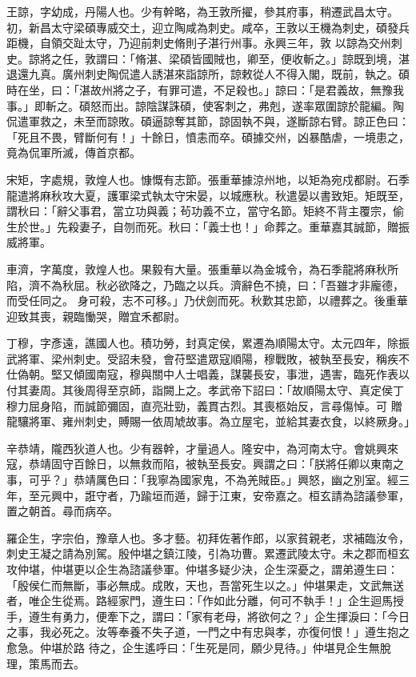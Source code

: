 \begin{pinyinscope}
 王諒，字幼成，丹陽人也。少有幹略，為王敦所擢，參其府事，稍遷武昌太守。初，新昌太守梁碩專威交土，迎立陶咸為刺史。咸卒，王敦以王機為刺史，碩發兵距機，自領交趾太守，乃迎前刺史脩則子湛行州事。永興三年，敦
 以諒為交州刺史。諒將之任，敦謂曰：「脩湛、梁碩皆國賊也，卿至，便收斬之。」諒既到境，湛退還九真。廣州刺史陶侃遣人誘湛來詣諒所，諒敕從人不得入閣，既前，執之。碩時在坐，曰：「湛故州將之子，有罪可遣，不足殺也。」諒曰：「是君義故，無豫我事。」即斬之。碩怒而出。諒陰謀誅碩，使客刺之，弗剋，遂率眾圍諒於龍編。陶侃遣軍救之，未至而諒敗。碩逼諒奪其節，諒固執不與，遂斷諒右臂。諒正色曰：「死且不畏，臂斷何有！」十餘日，憤恚而卒。碩據交州，凶暴酷虐，一境患之，竟為侃軍所滅，傳首京都。



 宋矩，字處規，敦煌人也。慷慨有志節。張重華據涼州地，以矩為宛戍都尉。石季龍遣將麻秋攻大夏，護軍梁式執太守宋晏，以城應秋。秋遣晏以書致矩。矩既至，謂秋曰：「辭父事君，當立功與義；茍功義不立，當守名節。矩終不背主覆宗，偷生於世。」先殺妻子，自刎而死。秋曰：「義士也！」命葬之。重華嘉其誠節，贈振威將軍。



 車濟，字萬度，敦煌人也。果毅有大量。張重華以為金城令，為石季龍將麻秋所陷，濟不為秋屈。秋必欲降之，乃臨之以兵。濟辭色不撓，曰：「吾雖才非龐德，而受任同之。
 身可殺，志不可移。」乃伏劍而死。秋歎其忠節，以禮葬之。後重華迎致其喪，親臨慟哭，贈宜禾都尉。



 丁穆，字彥遠，譙國人也。積功勞，封真定侯，累遷為順陽太守。太元四年，除振武將軍、梁州刺史。受詔未發，會苻堅遣眾寇順陽，穆戰敗，被執至長安，稱疾不仕偽朝。堅又傾國南寇，穆與關中人士唱義，謀襲長安，事泄，遇害，臨死作表以付其妻周。其後周得至京師，詣闕上之。孝武帝下詔曰：「故順陽太守、真定侯丁穆力屈身陷，而誠節彌固，直亮壯勁，義貫古烈。其喪柩始反，言尋傷悼。可
 贈龍驤將軍、雍州刺史，賻賜一依周虓故事。為立屋宅，並給其妻衣食，以終厥身。」



 辛恭靖，隴西狄道人也。少有器幹，才量過人。隆安中，為河南太守。會姚興來寇，恭靖固守百餘日，以無救而陷，被執至長安。興謂之曰：「朕將任卿以東南之事，可乎？」恭靖厲色曰：「我寧為國家鬼，不為羌賊臣。」興怒，幽之別室。經三年，至元興中，誑守者，乃踰垣而遁，歸于江東，安帝嘉之。桓玄請為諮議參軍，置之朝首。尋而病卒。



 羅企生，字宗伯，豫章人也。多才藝。初拜佐著作郎，以家貧親老，求補臨汝令，刺史王凝之請為別駕。殷仲堪之鎮江陵，引為功曹。累遷武陵太守。未之郡而桓玄攻仲堪，仲堪更以企生為諮議參軍。仲堪多疑少決，企生深憂之，謂弟遵生曰：「殷侯仁而無斷，事必無成。成敗，天也，吾當死生以之。」仲堪果走，文武無送者，唯企生從焉。路經家門，遵生曰：「作如此分離，何可不執手！」企生迴馬授手，遵生有勇力，便牽下之，謂曰：「家有老母，將欲何之？」企生揮淚曰：「今日之事，我必死之。汝等奉養不失子道，一門之中有忠與孝，亦復何恨！」遵生抱之愈急。仲堪於路
 待之，企生遙呼曰：「生死是同，願少見待。」仲堪見企生無脫理，策馬而去。




\end{pinyinscope}
